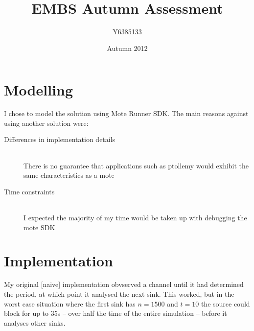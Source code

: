 \documentclass{article}
\title{EMBS Autumn Assessment}
\author{Y6385133}
\date{Autumn 2012}
\begin{document}
\maketitle

\section{Modelling}
I chose to model the solution using Mote Runner SDK. The main reasons against using another solution were:

\begin{description}
    \item[Differences in implementation details] \hfill \\
        There is no guarantee that applications such as ptollemy would exhibit the same characteristics as a mote
    \item[Time constraints] \hfill \\
        I expected the majority of my time would be taken up with debugging the mote {SDK}
\end{description}

\section{Implementation}
My original [naive] implementation obvserved a channel until it had determined the period, at which point it analysed
the next sink. This worked, but in the worst case situation where the first sink has $n=1500$ and $t=10$ the source could block
for up to 35s -- over half the time of the entire simulation -- before it analyses other sinks.


\noindent\hspace*{-45pt}
\end{document}
